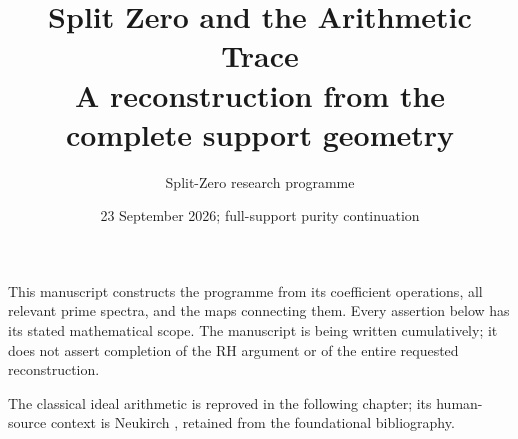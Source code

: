 \documentclass[11pt,a4paper]{article}
\title{Split Zero and the Arithmetic Trace\\A reconstruction from the complete support geometry}
\author{Split-Zero research programme}
\date{23 September 2026; full-support purity continuation}
\theoremstyle{definition}\newtheorem{definition}[theorem]{Definition}
\begin{document}
\maketitle
This manuscript constructs the programme from its coefficient operations, all relevant prime spectra, and the maps connecting them. Every assertion below has its stated mathematical scope. The manuscript is being written cumulatively; it does not assert completion of the RH argument or of the entire requested reconstruction.
\tableofcontents





The classical ideal arithmetic is reproved in the following chapter; its human-source context is Neukirch \cite{neukirch}, retained from the foundational bibliography.










































\end{document}
